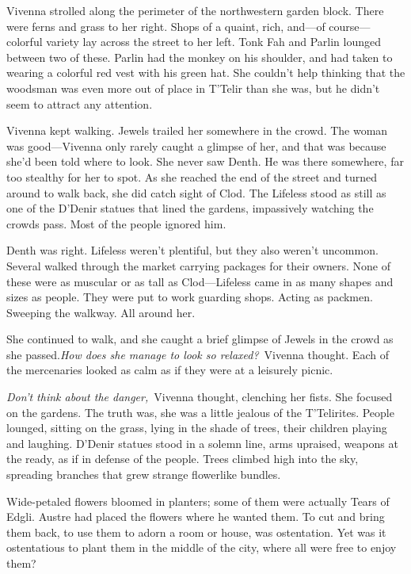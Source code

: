 Vivenna strolled along the perimeter of the northwestern garden block. There were ferns and grass to her right. Shops of a quaint, rich, and—of course—colorful variety lay across the street to her left. Tonk Fah and Parlin lounged between two of these. Parlin had the monkey on his shoulder, and had taken to wearing a colorful red vest with his green hat. She couldn’t help thinking that the woodsman was even more out of place in T’Telir than she was, but he didn’t seem to attract any attention.

Vivenna kept walking. Jewels trailed her somewhere in the crowd. The woman was good—Vivenna only rarely caught a glimpse of her, and that was because she’d been told where to look. She never saw Denth. He was there somewhere, far too stealthy for her to spot. As she reached the end of the street and turned around to walk back, she did catch sight of Clod. The Lifeless stood as still as one of the D’Denir statues that lined the gardens, impassively watching the crowds pass. Most of the people ignored him.

Denth was right. Lifeless weren’t plentiful, but they also weren’t uncommon. Several walked through the market carrying packages for their owners. None of these were as muscular or as tall as Clod—Lifeless came in as many shapes and sizes as people. They were put to work guarding shops. Acting as packmen. Sweeping the walkway. All around her.

She continued to walk, and she caught a brief glimpse of Jewels in the crowd as she passed.\textit{How does she manage to look so relaxed?}~Vivenna thought. Each of the mercenaries looked as calm as if they were at a leisurely picnic.

\textit{Don’t think about the danger,}~Vivenna thought, clenching her fists. She focused on the gardens. The truth was, she was a little jealous of the T’Telirites. People lounged, sitting on the grass, lying in the shade of trees, their children playing and laughing. D’Denir statues stood in a solemn line, arms upraised, weapons at the ready, as if in defense of the people. Trees climbed high into the sky, spreading branches that grew strange flowerlike bundles.

Wide-petaled flowers bloomed in planters; some of them were actually Tears of Edgli. Austre had placed the flowers where he wanted them. To cut and bring them back, to use them to adorn a room or house, was ostentation. Yet was it ostentatious to plant them in the middle of the city, where all were free to enjoy them?

